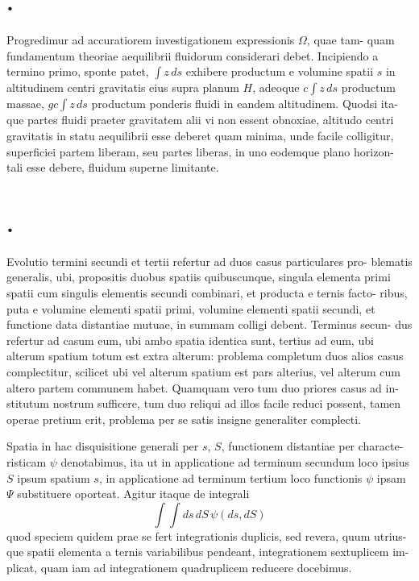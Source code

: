 \documentclass[12pt,a4paper]{article}
\theoremstyle{gauss}
\begin{document}
\newpage
\setcounter{page}{37}

\section*{%
%
\thesection.}

Progredimur ad accuratiorem investigationem expressionis $\Omega$, quae tam-
quam fundamentum theoriae aequilibrii fluidorum considerari debet. Incipiendo
a termino primo, sponte patet, $\int z\,ds$ exhibere productum e volumine spatii $s$ in
altitudinem centri gravitatis eius supra planum $H$, adeoque $c\int z\,ds$ productum
massae, $gc\int z\,ds$ productum ponderis fluidi in eandem altitudinem. Quodsi ita-
que partes fluidi praeter gravitatem alii vi non essent obnoxiae, altitudo centri
gravitatis in statu aequilibrii esse deberet quam minima, unde facile colligitur,
superficiei partem liberam, seu partes liberas, in uno eodemque plano horizon-
tali esse debere, fluidum superne limitante.

\section*{%
%
\thesection.}

Evolutio termini secundi et tertii refertur ad duos casus particulares pro-
blematis generalis, ubi, propositis duobus spatiis quibuscunque, singula elementa
primi spatii cum singulis elementis secundi combinari, et producta e ternis facto-
ribus, puta e volumine elementi spatii primi, volumine elementi spatii secundi,
et functione data distantiae mutuae, in summam colligi debent. Terminus secun-
dus refertur ad casum eum, ubi ambo spatia identica sunt, tertius ad eum, ubi
alterum spatium totum est extra alterum: problema completum duos alios casus
complectitur, scilicet ubi vel alterum spatium est pars alterius, vel alterum cum
altero partem communem habet. Quamquam vero tum duo priores casus ad in-
stitutum nostrum sufficere, tum duo reliqui ad illos facile reduci possent, tamen
operae pretium erit, problema per se satis insigne generaliter complecti.

Spatia in hac disquisitione generali per $s$, $S$, functionem distantiae per characte-
risticam $\psi$ denotabimus, ita ut in applicatione ad terminum secundum loco ipsius
$S$ ipsum spatium $s$, in applicatione ad terminum tertium loco functionis $\psi$ ipsam
$\Psi$ substituere oporteat. Agitur itaque de integrali
\[
\int\!\!\int ds\,dS\,\psi(ds,dS)
\]
quod speciem quidem prae se fert integrationis duplicis, sed revera, quum utrius-
que spatii elementa a ternis variabilibus pendeant, integrationem sextuplicem im-
plicat, quam iam ad integrationem quadruplicem reducere docebimus.
\end{document}
